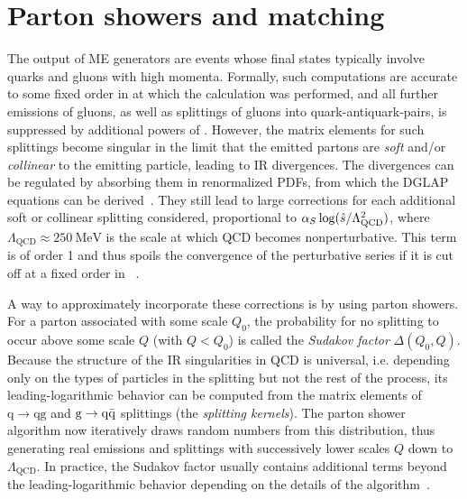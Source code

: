 \section{Parton showers and matching}
\label{sec:mc:showering}


The output of ME generators are events whose final states typically involve quarks and gluons with high momenta. Formally, such computations are accurate to some fixed order in \alphas at which the calculation was performed, and all further emissions of gluons, as well as splittings of gluons into quark-antiquark-pairs, is suppressed by additional powers of \alphas. 
However, the matrix elements for such splittings become singular in the limit that the emitted partons are \textit{soft} and/or \textit{collinear} to the emitting particle, leading to IR divergences. The divergences can be regulated by absorbing them in renormalized PDFs, from which the DGLAP equations can be derived~\cite{Skands:2012ts,Schwartz:2014sze}. They still lead to large corrections for each additional soft or collinear splitting considered, 
proportional to $\alpha_S \log( \hat{s} / \Lambda_{\mathrm{QCD}}^2)$, where $\Lambda_{\mathrm{QCD}} \approx \SI{250}{\MeV}$ is the scale at which QCD becomes nonperturbative. This term is of order 1 and thus spoils the convergence of the perturbative series if it is cut off at a fixed order in \alphas~\cite{Peskin:1995ev,Skands:2012ts}.

A way to approximately incorporate these corrections is by using parton showers. %
For a parton associated with some scale $Q_0$, the probability for no splitting to occur above some scale $Q$ (with $Q < Q_0$) is called the \textit{Sudakov factor} $\Delta(Q_0,Q)$. Because the structure of the IR singularities in QCD is universal, i.e. depending only on the types of particles in the splitting but not the rest of the process, its leading-logarithmic behavior can be computed from the matrix elements of $\mathrm{q \rightarrow qg}$ and $\mathrm{g \rightarrow \mathrm{q \bar{q}}}$ splittings (the \textit{splitting kernels}).
The parton shower algorithm now iteratively draws random numbers from this distribution, thus generating real emissions and splittings with successively lower scales $Q$ down to $\Lambda_{\mathrm{QCD}}$. In practice, the Sudakov factor usually contains additional terms beyond the leading-logarithmic behavior depending on the details of the algorithm~\cite{Skands:2012ts}.

